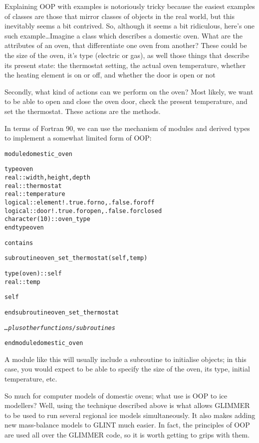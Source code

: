 Explaining OOP with examples is notoriously tricky because the easiest
examples of classes are those that mirror classes of objects in the real
world, but this inevitably seems a bit contrived. So, although it seems a bit
ridiculous, here's one such example\ldots Imagine a class which describes a
domestic oven. What are the attributes of an oven, that differentiate one oven
from another? These could be the size of the oven, it's type (electric or
gas), as well those things that describe its present state: the thermostat
setting, the actual oven temperature, whether the heating element is on or
off, and whether the door is open or not

Secondly, what kind of actions can we perform on the oven? Most likely, we
want to be able to open and close the oven door, check the present
temperature, and set the thermostat. These actions are the methods.

In terms of Fortran 90, we can use the mechanism of modules and derived types
to implement a somewhat limited form of OOP:
%
\begin{alltt}
  module domestic_oven

    type oven
      real :: width,height,depth
      real :: thermostat
      real :: temperature
      logical :: element      ! .true. for no, .false. for off
      logical :: door         ! .true. for open, .false. for closed
      character(10) :: oven_type
    end type oven

  contains

    subroutine oven_set_thermostat(self,temp)

      type(oven) :: self
      real :: temp

      self%temperature = temp

    end subroutine oven_set_thermostat

    \textrm{\textit{\ldots plus other functions/subroutines}}

  end module domestic_oven
\end{alltt}
%
A module like this will usually include a subroutine to initialise objects; in
this case, you would expect to be able to specify the size of the oven, its
type, initial temperature, etc.

So much for computer models of domestic ovens; what use is OOP to ice
modellers? Well, using the technique described above is what allows GLIMMER to
be used to run several regional ice models simultaneously. It also makes
adding new mass-balance models to GLINT much easier. In fact, the principles
of OOP are used all over the GLIMMER code, so it is worth getting to grips
with them.
%
